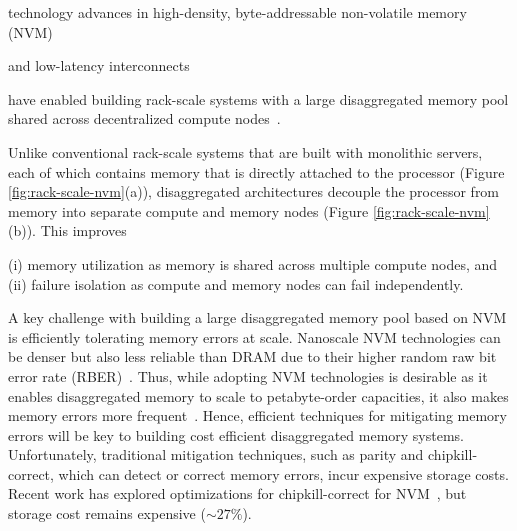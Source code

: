 
 technology advances in high-density, byte-addressable non-volatile memory (NVM)
and low-latency interconnects
have enabled building rack-scale systems with a large disaggregated memory pool shared across decentralized compute nodes~\cite{pinto:thymesis:micro:2020, tsai:dpm:atc:2020}.
Unlike conventional rack-scale systems that are built with monolithic servers, each of which contains memory that is directly attached to the processor (Figure \ref{fig:rack-scale-nvm}(a)), disaggregated architectures decouple the processor from memory into separate compute and memory nodes  (Figure \ref{fig:rack-scale-nvm}(b)). 
This improves 
(i) memory utilization as memory is shared across multiple compute nodes, and (ii) failure isolation as compute and memory nodes can fail independently. 

A key challenge with building a large disaggregated memory pool based on NVM is efficiently tolerating memory errors at scale.
Nanoscale NVM technologies can be denser but also less reliable than DRAM due to their higher random raw bit error rate (RBER)~\cite{zhang:pm-chipkill:micro:2018}.
Thus, while adopting NVM technologies is desirable as it enables disaggregated memory to scale to petabyte-order capacities, it also makes memory errors more frequent~\cite{faraboschi:mem-centric-os:hotos:2015}.
Hence, efficient techniques for mitigating memory errors will be key to building cost efficient disaggregated memory systems.
Unfortunately, traditional mitigation techniques, such as parity and chipkill-correct, which can detect or correct memory errors, incur expensive storage costs.
Recent work has explored optimizations for chipkill-correct for NVM~\cite{zhang:pm-chipkill:micro:2018}, but storage cost remains  expensive ($\sim27\%$).


